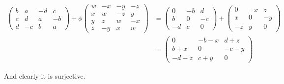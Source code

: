 \documentclass[12pt]{article}
\begin{document}
\begin{align*}
\begin{pmatrix}
                b & a & -d & c\\
                c & d & a & -b\\
                d & -c & b & a
            \end{pmatrix} + \phi\begin{pmatrix}
                w & -x & -y & -z\\
                x & w & -z & y\\
                y & z & w & -x\\
                z & -y & x & w
            \end{pmatrix} &= \begin{pmatrix}
                0 & -b & d\\
                b & 0 & -c\\
                -d & c & 0
            \end{pmatrix} + \begin{pmatrix}
                0 & -x & z\\
                x & 0 & -y\\
                -z & y & 0
            \end{pmatrix}\\
            &= \begin{pmatrix}
                0 & -b -x & d+z\\
                b+x & 0 & -c-y\\
                -d-z & c+y & 0
            \end{pmatrix}
        \end{align*}

        And clearly it is surjective. 
\end{document}
